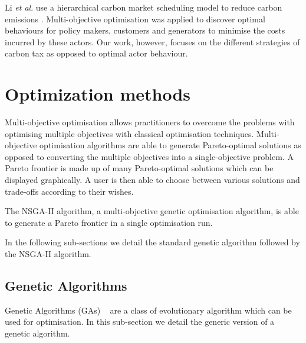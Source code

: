 \documentclass[sigconf]{acmart}
\begin{document}
Li \textit{et al}. use a hierarchical carbon market scheduling model to reduce carbon emissions \cite{Li2017}. Multi-objective optimisation was applied to discover optimal behaviours for policy makers, customers and generators to minimise the costs incurred by these actors. Our work, however, focuses on the different strategies of carbon tax as opposed to optimal actor behaviour.



\section{Optimization methods}
\label{sec:optimization_methods}

Multi-objective optimisation allows practitioners to overcome the problems with optimising multiple objectives with classical optimisation techniques. Multi-objective optimisation algorithms are able to generate Pareto-optimal solutions as opposed to converting the multiple objectives into a single-objective problem. A Pareto frontier is made up of many Pareto-optimal solutions which can be displayed graphically. A user is then able to choose between various solutions and trade-offs according to their wishes.

The NSGA-II algorithm, a multi-objective genetic optimisation algorithm, is able to generate a Pareto frontier in a single optimisation run. 

In the following sub-sections we detail the standard genetic algorithm followed by the NSGA-II algorithm.

\subsection{Genetic Algorithms}

Genetic Algorithms (GAs) ~\cite{Holland1975} are a class of evolutionary algorithm which can be used for optimisation. In this sub-section we detail the generic version of a genetic algorithm.
\end{document}
